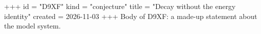 +++
id = "D9XF"
kind = "conjecture"
title = "Decay without the energy identity"
created = 2026-11-03
+++
Body of D9XF: a made-up statement about the model system.
